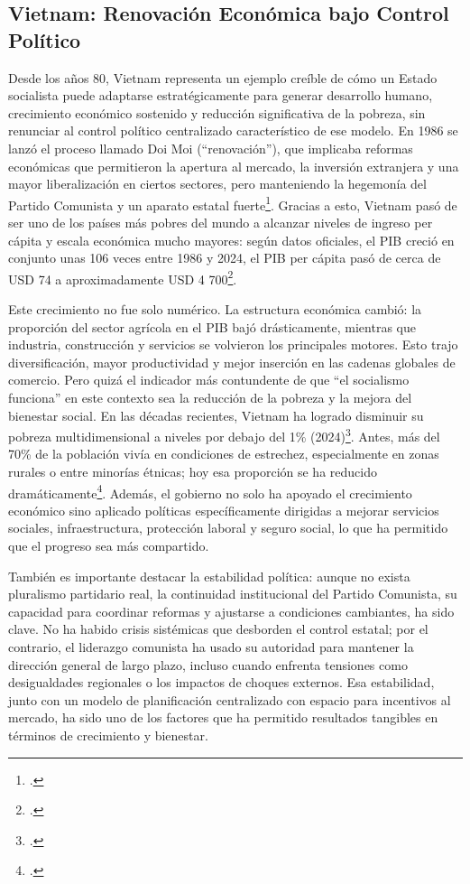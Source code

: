\documentclass[12pt, letterpaper]{article}
\begin{document}
\subsection*{Vietnam: Renovación Económica bajo Control Político}
Desde los años 80, Vietnam representa un ejemplo creíble de cómo un Estado socialista puede adaptarse estratégicamente para generar desarrollo humano, crecimiento económico sostenido y reducción significativa de la pobreza, sin renunciar al control político centralizado característico de ese modelo. En 1986 se lanzó el proceso llamado Doi Moi (“renovación”), que implicaba reformas económicas que permitieron la apertura al mercado, la inversión extranjera y una mayor liberalización en ciertos sectores, pero manteniendo la hegemonía del Partido Comunista y un aparato estatal fuerte\footcite{vneconomy_2021}. Gracias a esto, Vietnam pasó de ser uno de los países más pobres del mundo a alcanzar niveles de ingreso per cápita y escala económica mucho mayores: según datos oficiales, el PIB creció en conjunto unas 106 veces entre 1986 y 2024, el PIB per cápita pasó de cerca de USD 74 a aproximadamente USD 4 700\footcite{vietnamvn_2024}.

Este crecimiento no fue solo numérico. La estructura económica cambió: la proporción del sector agrícola en el PIB bajó drásticamente, mientras que industria, construcción y servicios se volvieron los principales motores. Esto trajo diversificación, mayor productividad y mejor inserción en las cadenas globales de comercio. Pero quizá el indicador más contundente de que “el socialismo funciona” en este contexto sea la reducción de la pobreza y la mejora del bienestar social. En las décadas recientes, Vietnam ha logrado disminuir su pobreza multidimensional a niveles por debajo del 1\% (2024)\footcite{vietnamplus_2024}. Antes, más del 70\% de la población vivía en condiciones de estrechez, especialmente en zonas rurales o entre minorías étnicas; hoy esa proporción se ha reducido dramáticamente\footcite{qdnd_2023}. Además, el gobierno no solo ha apoyado el crecimiento económico sino aplicado políticas específicamente dirigidas a mejorar servicios sociales, infraestructura, protección laboral y seguro social, lo que ha permitido que el progreso sea más compartido.

También es importante destacar la estabilidad política: aunque no exista pluralismo partidario real, la continuidad institucional del Partido Comunista, su capacidad para coordinar reformas y ajustarse a condiciones cambiantes, ha sido clave. No ha habido crisis sistémicas que desborden el control estatal; por el contrario, el liderazgo comunista ha usado su autoridad para mantener la dirección general de largo plazo, incluso cuando enfrenta tensiones como desigualdades regionales o los impactos de choques externos. Esa estabilidad, junto con un modelo de planificación centralizado con espacio para incentivos al mercado, ha sido uno de los factores que ha permitido resultados tangibles en términos de crecimiento y bienestar.
\end{document}
